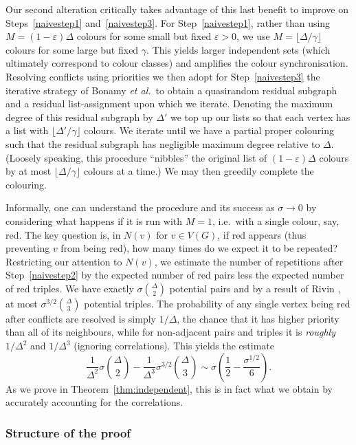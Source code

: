 \documentclass[11pt]{article}
\theoremstyle{plain}
\newcommand{\eps}{\varepsilon}
\begin{document}
Our second alteration critically takes advantage of this last benefit to improve on Steps~\ref{naivestep1} and~\ref{naivestep3}. For Step~\ref{naivestep1}, rather than using $M=(1-\eps)\Delta$ colours for some small but fixed $\eps>0$, we use $M=\lfloor\Delta/\gamma\rfloor$ colours for some large but fixed $\gamma$. This yields larger independent sets (which ultimately correspond to colour classes) and amplifies the colour synchronisation. Resolving conflicts using priorities we then adopt for Step~\ref{naivestep3} the iterative strategy of Bonamy {\em et al.}~to obtain a quasirandom residual subgraph and a residual list-assignment upon which we iterate. Denoting the maximum degree of this residual subgraph by $\Delta'$ we top up our lists so that each vertex has a list with $\lfloor\Delta'/\gamma\rfloor$ colours.  We iterate until we have a partial proper colouring such that the residual subgraph has negligible maximum degree relative to $\Delta$. (Loosely speaking, this procedure ``nibbles'' the original list of $(1-\eps)\Delta$ colours by at most $\lfloor\Delta/\gamma\rfloor$ colours at a time.) We may then greedily complete the colouring.



Informally, one can understand the procedure and its success as $\sigma\to 0$ by considering what happens if it is run with $M=1$, i.e.~with a single colour, say, red. %
The key question is, in $N(v)$ for $v\in V(G)$, if red appears (thus preventing $v$ from being red), how many times do we expect it to be repeated? Restricting our attention to $N(v)$, we estimate the number of repetitions after Step~\ref{naivestep2} by the expected number of red pairs less the expected number of red triples. We have exactly $\sigma{\Delta\choose 2}$ potential pairs and by a result of Rivin \cite{Riv02}, at most $\sigma^{3/2}{\Delta\choose 3}$ potential triples. The probability of any single vertex being red after conflicts are resolved is simply $1/\Delta$, the chance that it has higher priority than all of its neighbours,  while for non-adjacent pairs and triples it is \emph{roughly} $1/\Delta^2$ and $1/\Delta^3$ (ignoring correlations). This yields the estimate
\[\frac{1}{\Delta^2}\sigma{\Delta\choose 2}-\frac{1}{\Delta^3}\sigma^{3/2}{\Delta\choose 3}\sim \sigma\left(\frac12 - \frac{\sigma^{1/2}}{6}\right).\]
As we prove in Theorem~\ref{thm:independent}, this is in fact what we obtain by accurately accounting for the correlations.


\subsubsection*{Structure of the proof}
\end{document}
